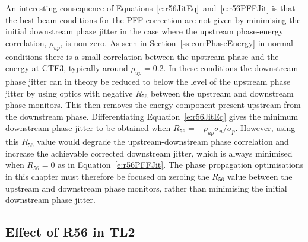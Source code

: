 An interesting consequence of Equations~\ref{e:r56JitEq}~and~\ref{e:r56PFFJit} is that the best beam conditions for the PFF correction are not given by minimising the initial downstream phase jitter in the case where the upstream phase-energy correlation, \(\rho_{up}\), is non-zero. As seen in Section~\ref{ss:corrPhaseEnergy} in normal conditions there is a small correlation between the upstream phase and the energy at CTF3, typically around \(\rho_{up}=0.2\). In these conditions the downstream phase jitter can in theory be reduced to below the level of the upstream phase jitter by using optics with negative \(R_{56}\) between the upstream and downstream phase monitors. This then removes the energy component present upstream from the downstream phase. Differentiating Equation~\ref{e:r56JitEq} gives the minimum downstream phase jitter to be obtained when \(R_{56} = -\rho_{up}\sigma_u/\sigma_p\). However, using this \(R_{56}\) value would degrade the upstream-downstream phase correlation and increase the achievable corrected downstream jitter, which is always minimised when \(R_{56} = 0\) as in Equation~\ref{e:r56PFFJit}. The phase propagation optimisations in this chapter must therefore be focused on zeroing the \(R_{56}\) value between the upstream and downstream phase monitors, rather than minimising the initial downstream phase jitter. 

\subsection{Effect of R56 in TL2}
\label{ss:r56TL2Effect}


